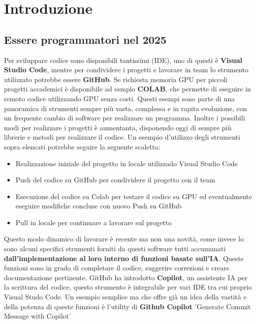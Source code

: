 \documentclass[12pt,a4paper,openright,twoside]{book}
\begin{document}
\chapter{Introduzione}
\label{chap:introduction}

\section{Essere programmatori nel 2025}
Per sviluppare codice sono disponibili tantissimi (IDE), uno di questi è \textbf{Visual Studio Code},
mentre per condividere i progetti e lavorare in team lo strumento utilizzato potrebbe essere  \textbf{GitHub}.
Se richiesta memoria GPU per piccoli progetti accademici è disponibile ad esmpio \textbf{COLAB}, che permette di eseguire in remoto codice utilizzando GPU senza costi.
Questi esempi sono parte di una panoramica di strumenti sempre più vasta, complessa e in rapita evoluzione, con un frequente cambio di software per realizzare un programma.
Inoltre i possibili modi per realizzare i progetti è aumentanta, disponendo oggi di sempre più librerie e metodi per realizzare il codice.
Un esempio d'utilizzo degli strumenti sopra elencati potrebbe seguire la seguente scaletta:
\begin{itemize}
    \item Realizzazione iniziale del progetto in locale utilizzado Visual Studio Code
    \item Push del codice su GitHub per condividere il progetto con il team
    \item Esecuzione del codice su Colab per testare il codice su GPU ed eventualmente eseguire modifiche concluse con nuovo Push su GitHub
    \item Pull in locale per continuare a lavorare sul progetto
\end{itemize}
Questo modo dinamico di lavorare è recente ma non una novità, come invece lo sono alcuni specifici strumenti forniti da questi software tutti accumunati \textbf{dall'implementazione al loro interno di funzioni basate sull'IA}.
Queste funzioni sono in grado di completare il codice, suggerire correzioni e creare documentazione pertinente.
GitHub ha introdotto \textbf{Copilot}, un assistente IA per la scrittura del codice, questo strumento è integrabile per vari IDE tra cui proprio Visual Studo Code.
Un esempio semplice ma che offre già un idea della vastità e della potenza di queste funzioni è l'utility di \textbf{Github Copilot} 'Generate Commit Message with Copilot'
\end{document}
